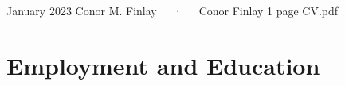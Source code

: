 \documentclass[8pt,a4paper,]{awesome-cv}
\begin{document}
\makecvheader

\makecvfooter
  {January 2023}
    {Conor M. Finlay~~~·~~~Conor Finlay 1 page CV.pdf}
  {\thepage}





\hypertarget{employment-and-education}{%
\section{Employment and Education}\label{employment-and-education}}
\end{document}
